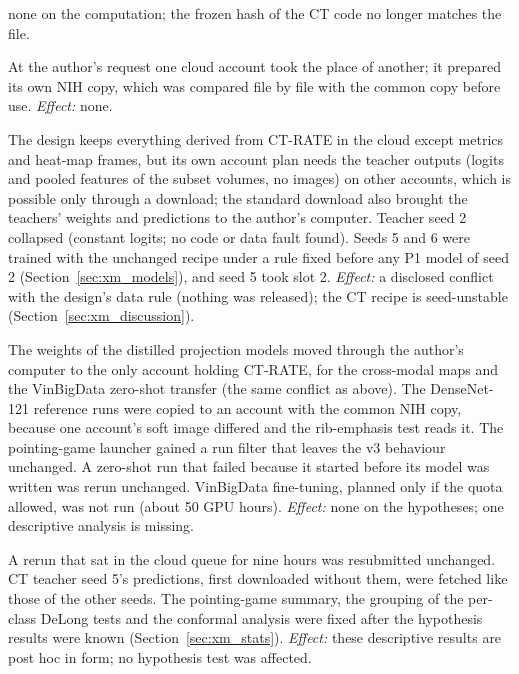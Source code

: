\begin{description}
 none on the computation; the frozen hash of the CT code no longer matches the file.
\item[2026-11-08, accounts.] At the author's request one cloud account took the place of another; it prepared its own NIH copy, which was
 compared file by file with the common copy before use. \emph{Effect:} none.
\item[2026-11-09, CT teacher outputs and seed 2.] The design keeps everything derived from CT-RATE in the cloud except metrics and heat-map
 frames, but its own account plan needs the teacher outputs (logits and pooled features of the subset volumes, no images) on other accounts,
 which is possible only through a download; the standard download also brought the teachers' weights and predictions to the author's
 computer. Teacher seed 2 collapsed (constant logits; no code or data fault found). Seeds 5 and 6 were trained with the unchanged recipe
 under a rule fixed before any P1 model of seed 2 (Section~\ref{sec:xm_models}), and seed 5 took slot 2. \emph{Effect:} a disclosed
 conflict with the design's data rule (nothing was released); the CT recipe is seed-unstable (Section~\ref{sec:xm_discussion}).
\item[2026-11-09, last kernels.] The weights of the distilled projection models moved through the author's computer to the only account
 holding CT-RATE, for the cross-modal maps and the VinBigData zero-shot transfer (the same conflict as above). The DenseNet-121 reference runs
 were copied to an account with the common NIH copy, because one account's soft image differed and the rib-emphasis test reads it. The
 pointing-game launcher gained a run filter that leaves the v3 behaviour unchanged. A zero-shot run that failed because it started before its
 model was written was rerun unchanged. VinBigData fine-tuning, planned only if the quota allowed, was not run (about 50 GPU hours).
 \emph{Effect:} none on the hypotheses; one descriptive analysis is missing.
\item[2026-11-10, collection and descriptive summaries.] A rerun that sat in the cloud queue for nine hours was resubmitted unchanged. CT
 teacher seed 5's predictions, first downloaded without them, were fetched like those of the other seeds. The pointing-game summary, the
 grouping of the per-class DeLong tests and the conformal analysis were fixed after the hypothesis results were known
 (Section~\ref{sec:xm_stats}). \emph{Effect:} these descriptive results are post hoc in form; no hypothesis test was affected.
\end{description}
